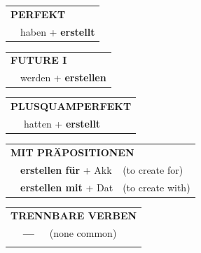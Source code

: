 \documentclass[10pt,a4paper]{revtex4-2}
\begin{document}
\begin{verbbox}
 \begin{tabular}{rl}
     \multicolumn{2}{l}{\textbf{PERFEKT}}\\
   & haben + \textbf{erstellt}\\
  \end{tabular}
\hfill
   \begin{tabular}{rl}
    \multicolumn{2}{l}{\textbf{FUTURE I} }\\
   & werden + \textbf{erstellen}\\
  \end{tabular}
\hfill
   \begin{tabular}{rl}
      \multicolumn{2}{l}{\textbf{PLUSQUAMPERFEKT}}\\
   & hatten + \textbf{erstellt}\\
  \end{tabular}

   \vspace{10pt}

   \begin{tabular}{lll}
      \multicolumn{3}{l}{\textbf{MIT PRÄPOSITIONEN}}\\
& \textbf{erstellen für} + Akk & (to create for)\\
& \textbf{erstellen mit} + Dat & (to create with)\\
\end{tabular}
  \hfill
   \begin{tabular}{lll}
      \multicolumn{3}{l}{\textbf{TRENNBARE VERBEN}}\\
 & \textbf{---} & (none common)\\
\vspace{10pt}
  \end{tabular}

  \vspace{-5pt}

\end{verbbox}
\end{document}
